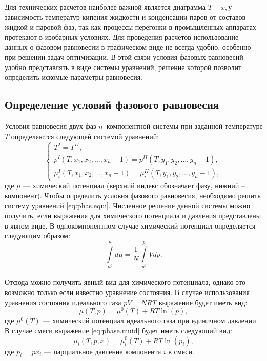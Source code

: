 Для технических расчетов наиболее важной является диаграмма $T-x, у$ --- зависимость температур кипения жидкости и конденсации паров от составов жидкой и паровой фаз, так как процессы перегонки в промышленных аппаратах протекают в изобарных условиях. Для проведения расчетов использование данных о фазовом равновесии в графическом виде не всегда удобно, особенно при решении задач оптимизации. В этой связи условия фазовых равновесий удобно представлять в виде системы уравнений, решение которой позволит определить искомые параметры равновесия. 



\subsection*{Определение условий фазового равновесия}
Условия равновесия двух фаз $n$--компонентной системы при заданной температуре $T$ определяются следующей системой уравнений:
\begin{equation}\label{eq:phas.equi}
\left\lbrace 
\begin{gathered} 
T^{I}=T^{II},\\
p^{I}(T,x_1,x_2,...,x_n-1)=p^{II}(T,y_1,y_2,...,y_n-1),\\
\mu_i^{I}(T,x_1,x_2,...,x_n-1)=\mu^{II}_i(T,y_1,y_2,...,y_n-1),
\end{gathered} 
\right.
\end{equation}
где $\mu$ --- химический потенциал (верхний индекс обозначает фазу, нижний – компонент). Чтобы определить условия фазового равновесия, необходимо решить систему уравнений \eqref{eq:phas.equi}. Численное решение данной системы можно получить, если выражения для химического потенциала и давления представлены в явном виде.
В однокомпонентном случае химический потенциал определяется следующим образом:
\begin{equation}
\int\limits_{\mu^0}^{\mu} d \mu=\dfrac{1}{N} \int\limits_{p^0}^{p} Vdp.
\end{equation}

Отсюда можно получить явный вид для химического потенциала, однако это возможно только если известно уравнение состояния. В случае использования уравнения состояния идеального газа $pV=NRT$ выражение будет иметь вид:
\begin{equation} \label{eq:phase.muid}
	\mu(T,p)=\mu^0(T)+RT \ln (p),
\end{equation}
где $\mu^0(T)$ --- химический потенциал идеального газа при единичном давлении. В случае смеси выражение \eqref{eq:phase.muid} будет иметь следующий вид:
\begin{equation} \label{eq:phase.muidi}
	\mu_i (T,p,x) = \mu_i^0(T) + RT \ln(p_i),
\end{equation}
где $p_i=p x_i$ --- парциальное давление компонента $i$ в смеси.


